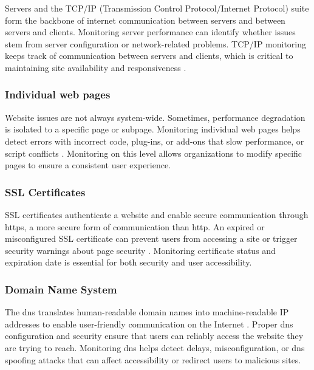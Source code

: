 Servers and the TCP/IP (Transmission Control Protocol/Internet Protocol) suite form the backbone of internet communication between servers and between servers and clients. Monitoring server performance can identify whether issues stem from server configuration or network-related problems. TCP/IP monitoring keeps track of communication between servers and clients, which is critical to maintaining site availability and responsiveness \autocite{IBMwebmonitor}.

\subsubsection{Individual web pages}
\label{subsubsec:individual_web_pages}


Website issues are not always system-wide. Sometimes, performance degradation is isolated to a specific page or subpage. Monitoring individual web pages helps detect errors with incorrect code, plug-ins, or add-ons that slow performance, or script conflicts \autocite{IBMwebmonitor}. Monitoring on this level allows organizations to modify specific pages to ensure a consistent user experience.

\subsubsection{SSL Certificates}
\label{subsubsec:ssl_certs}


SSL certificates authenticate a website and enable secure communication through \acrshort{https}, a more secure form of communication than \acrshort{http}. An expired or misconfigured SSL certificate can prevent users from accessing a site or trigger security warnings about page security \autocite{IBMwebmonitor}. Monitoring certificate status and expiration date is essential for both security and user accessibility.

\subsubsection{Domain Name System}
\label{subsubsec:domain_name_system}


The \acrfull{dns} translates human-readable domain names into machine-readable IP addresses to enable user-friendly communication on the Internet \autocite{DNS}. Proper \acrshort{dns} configuration and security ensure that users can reliably access the website they are trying to reach. Monitoring \acrshort{dns} helps detect delays, misconfiguration, or \acrshort{dns} spoofing attacks that can affect accessibility or redirect users to malicious sites. 

